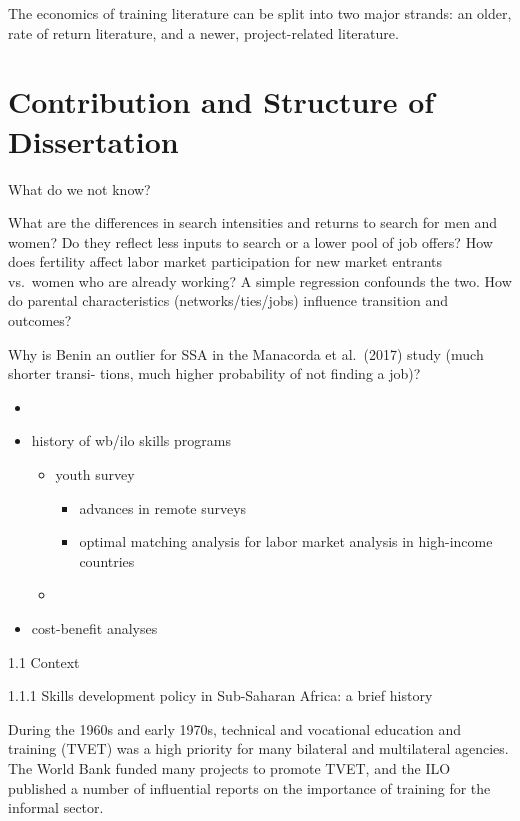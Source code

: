 \documentclass[
  a4paper, twoside, 12pt]{book}
\providecommand{\tightlist}{%
  \setlength{\itemsep}{0pt}\setlength{\parskip}{0pt}}
\begin{document}
The economics of training literature can be split into two major strands: an older, rate of return literature, and a newer, project-related literature.

\hypertarget{contribution-and-structure-of-dissertation}{%
\section{Contribution and Structure of Dissertation}\label{contribution-and-structure-of-dissertation}}

What do we not know?

What are the differences in search intensities and returns to search for men and women? Do they reflect less inputs to search or a lower pool of job offers?
How does fertility affect labor market participation for new market entrants vs.~women who are already working? A simple regression confounds the two.
How do parental characteristics (networks/ties/jobs) influence transition and outcomes?

Why is Benin an outlier for SSA in the Manacorda et al.~(2017) study (much shorter transi- tions, much higher probability of not finding a job)?

\begin{itemize}
\tightlist
\item
\item
  history of wb/ilo skills programs

  \begin{itemize}
  \tightlist
  \item
    youth survey

    \begin{itemize}
    \tightlist
    \item
      advances in remote surveys
    \item
      optimal matching analysis for labor market analysis in high-income countries
    \end{itemize}
  \item
  \end{itemize}
\item
  cost-benefit analyses
\end{itemize}

1.1 Context

1.1.1 Skills development policy in Sub-Saharan Africa: a brief history

During the 1960s and early 1970s, technical and vocational education and training (TVET) was a high priority for many bilateral and multilateral agencies. The World Bank funded many projects to promote TVET, and the ILO published a number of influential reports on the importance of training for the informal sector.
\end{document}

